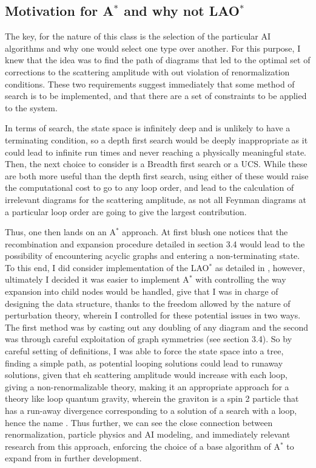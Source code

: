 \documentclass{article}
\begin{document}
\subsection{Motivation for A$^*$ and why not LAO$^*$}
\hspace{0.5 cm}The key, for the nature of this class is the selection of the particular AI algorithms and why one would select one type over another. 
For this purpose, I knew that the idea was to find the path of diagrams that led to the optimal set of corrections to the scattering amplitude with out violation of renormalization conditions. These two requirements suggest immediately that some method of search is to be implemented, and that there are a set of constraints to be applied to the system. 

\hspace{0.5 cm} In terms of search, the state space is infinitely deep and is unlikely to have a terminating condition, so a depth first search would be deeply inappropriate as it could lead to infinite run times and never reaching a physically meaningful state. 
Then, the next choice to consider is a Breadth first search or a UCS. While these are both more useful than the depth first search, using either of these would raise the computational cost to go to any loop order, and lead to the calculation of irrelevant diagrams for the scattering amplitude, as not all Feynman diagrams at a particular loop order are going to give the largest contribution. 

\hspace{0.5 cm} Thus, one then lands on an A$^*$ approach. At first blush one notices that the recombination and expansion procedure detailed in section 3.4 would lead to the possibility of encountering acyclic graphs and entering a non-terminating state. To this end, I did consider implementation of the LAO$^*$ as detailed in \cite{Hansen}, however, ultimately I decided it was easier to implement A$^*$ with controlling the way expansion into child nodes would be handled, give that I was in charge of designing the data structure, thanks to the freedom allowed by the nature of perturbation theory, wherein I controlled for these potential issues in two ways. 
The first method was by casting out any doubling of any diagram and the second was through careful exploitation of graph symmetries (see section 3.4).
So by careful setting of definitions, I was able to force the state space into a tree, finding a simple path, as potential looping solutions could lead to runaway solutions, given that eh scattering amplitude would increase with each loop, giving a non-renormalizable theory, making it an appropriate approach for a theory like loop quantum gravity, wherein the graviton is a spin 2 particle that has a run-away divergence corresponding to a solution of a search with a loop, hence the name \cite{Bodendorfer2020} \cite{Jacobson2007}. Thus further, we can see the close connection between renormalization, particle physics and AI modeling, and immediately relevant research from this approach, enforcing the choice of a base algorithm of A$^*$ to expand from in further development.
\end{document}
